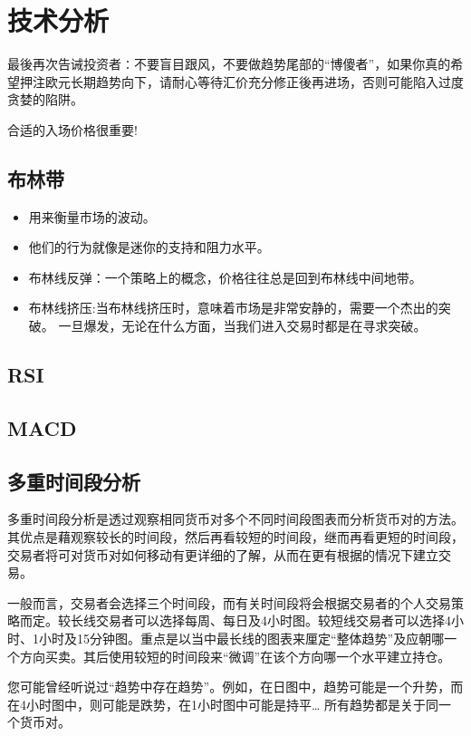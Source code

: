 \chapter{技术分析}

最後再次告诫投资者∶不要盲目跟风，不要做趋势尾部的“博傻者”，如果你真的希望押注欧元长期趋势向下，请耐心等待汇价充分修正後再进场，否则可能陷入过度贪婪的陷阱。

合适的入场价格很重要!

\section{布林带}
\begin{itemize}

\item 用来衡量市场的波动。
\item 他们的行为就像是迷你的支持和阻力水平。
\item 布林线反弹：一个策略上的概念，价格往往总是回到布林线中间地带。
\item 布林线挤压:当布林线挤压时，意味着市场是非常安静的，需要一个杰出的突破。 一旦爆发，无论在什么方面，当我们进入交易时都是在寻求突破。
\end{itemize}


\section{RSI}

\section{MACD}

\section{多重时间段分析}


多重时间段分析是透过观察相同货币对多个不同时间段图表而分析货币对的方法。其优点是藉观察较长的时间段，然后再看较短的时间段，继而再看更短的时间段，交易者将可对货币对如何移动有更详细的了解，从而在更有根据的情况下建立交易。


一般而言，交易者会选择三个时间段，而有关时间段将会根据交易者的个人交易策略而定。较长线交易者可以选择每周、每日及4小时图。较短线交易者可以选择4小时、1小时及15分钟图。重点是以当中最长线的图表来厘定“整体趋势”及应朝哪一个方向买卖。其后使用较短的时间段来“微调”在该个方向哪一个水平建立持仓。


您可能曾经听说过“趋势中存在趋势”。例如，在日图中，趋势可能是一个升势，而在4小时图中，则可能是跌势，在1小时图中可能是持平… 所有趋势都是关于同一个货币对。


